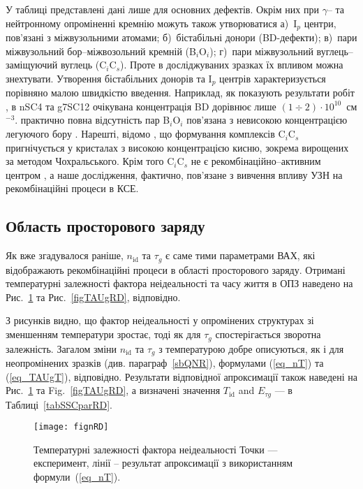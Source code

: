 У таблиці представлені дані лише для основних дефектів.
Окрім них при $\gamma$-- та нейтронному опроміненні кремнію можуть також утворюватися
а)~I$_p$ центри, пов'язані з міжвузольними атомами;
б)~бістабільні донори (BD-дефекти);
в)~пари міжвузольний бор--міжвозольний кремній (B$_i$O$_i$);
г)~пари міжвузольний вуглець--заміщуючий вуглець (C$_i$C$_s$).
Проте в досліджуваних зразках їх впливом можна знехтувати.
Утворення бістабільних донорів та I$_p$ центрів характеризується порівняно малою швидкістю введення.
Наприклад, як показують результати робіт \cite{n:gamma,BD:Fret}, в nSC4 та g7SC12 очікувана
концентрація BD дорівнює лише $(1\div2)\cdot10^{10}$~см$^{-3}$.
практично повна відсутність пар B$_i$O$_i$ пов'язана з невисокою концентрацією легуючого бору \cite{SiIntDef}.
Нарешті, відомо \cite{gamma:Kolkr,gamma:Stahl,n:long}, що формування комплексів C$_i$C$_s$ пригнічується у кристалах
з високою концентрацією кисню, зокрема вирощених за методом Чохральського.
Крім того  C$_i$C$_s$ не є рекомбінаційно--активним центром \cite{CiCs:Song}, а наше дослідження,
фактично, пов'язане з вивчення впливу УЗН на рекомбінаційні процеси в КСЕ.



\subsection{Область просторового заряду\label{sbSCR}}

Як вже згадувалося раніше, $n_{\mathrm{id}}$ та $\tau_{g}$ є саме тими параметрами ВАХ, які відображають рекомбінаційні процеси в
області просторового заряду.
Отримані температурні залежності фактора неідеальності та часу життя в ОПЗ наведено на Рис.~\ref{fignRD} та Рис.~\ref{figTAUgRD}, відповідно.



З рисунків видно, що фактор неідеальності у опромінених структурах зі зменшенням температури зростає,
тоді як для $\tau_{g}$ спостерігається зворотна залежність.
Загалом зміни $n_{\mathrm{id}}$ та $\tau_{g}$ з температурою добре описуються, як і для неопромінених зразків (див. параграф~\ref{sbQNR}),
 формулами (\ref{eq_nT}) та
(\ref{eq_TAUgT}), відповідно.
Результати відповідної апроксимації також наведені на Рис.~\ref{fignRD} та Fig.~\ref{figTAUgRD},
а визначені значення $T_{\mathrm{id}}$ and $E_{\tau g}$ --- в Таблиці~\ref{tabSSCparRD}.

\begin{figure}
\center
\texttt{[image: fignRD]}%
\caption{\label{fignRD}
Температурні залежності фактора неідеальності
\FigCaptionSSCRD
Точки --- експеримент,
лінії -- результат апроксимації з використанням формули~(\ref{eq_nT}).
}%
\end{figure}


